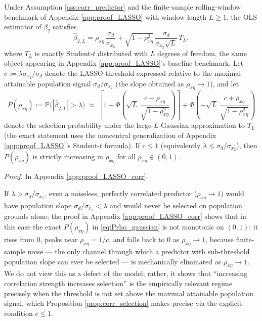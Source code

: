 \begin{proposition}\label{prop:corr_selection}
Under Assumption \ref{ass:corr_predictor} and the finite-sample rolling-window benchmark of Appendix \ref{app:proof_LASSO} with window length $L\geq 1$, the OLS estimator of $\beta_2$ satisfies
\begin{equation}\label{eq:beta2hat_L}
\hat\beta_{2,L} = \rho_{x\eta}\,\frac{\sigma_d}{\sigma_{x_2}} + \sqrt{1-\rho_{x\eta}^2}\,\frac{\sigma_d}{\sigma_{x_2}\sqrt L}\,T_L,
\end{equation}
where $T_L$ is exactly Student-$t$ distributed with $L$ degrees of freedom, the same object appearing in Appendix \ref{app:proof_LASSO}'s baseline benchmark. Let $c:=\lambda\sigma_{x_2}/\sigma_d$ denote the LASSO threshold expressed relative to the maximal attainable population signal $\sigma_d/\sigma_{x_2}$ (the slope obtained as $\rho_{x\eta}\to1$), and let
\begin{equation}\label{eq:Prho_gaussian}
P(\rho_{x\eta}) := \mathbb P\bigl(|\hat\beta_{2,L}|>\lambda\bigr) \;\approx\; \left[1-\Phi\!\left(\sqrt L\,\frac{c-\rho_{x\eta}}{\sqrt{1-\rho_{x\eta}^2}}\right)\right] + \Phi\!\left(-\sqrt L\,\frac{c+\rho_{x\eta}}{\sqrt{1-\rho_{x\eta}^2}}\right)
\end{equation}
denote the selection probability under the large-$L$ Gaussian approximation to $T_L$ (the exact statement uses the noncentral generalization of Appendix \ref{app:proof_LASSO}'s Student-$t$ formula). If $c\leq 1$ (equivalently $\lambda\leq\sigma_d/\sigma_{x_2}$), then $P(\rho_{x\eta})$ is strictly increasing in $\rho_{x\eta}$ for all $\rho_{x\eta}\in(0,1)$.
\end{proposition}
\textit{Proof.} In Appendix \ref{app:proof_LASSO_corr}.

\begin{remark}\label{rem:c_greater_1}
If $\lambda>\sigma_d/\sigma_{x_2}$, even a noiseless, perfectly correlated predictor ($\rho_{x\eta}\to1$) would have population slope $\sigma_d/\sigma_{x_2}<\lambda$ and would never be selected on population grounds alone; the proof in Appendix \ref{app:proof_LASSO_corr} shows that in this case the exact $P(\rho_{x\eta})$ in \eqref{eq:Prho_gaussian} is not monotonic on $(0,1)$: it rises from $0$, peaks near $\rho_{x\eta}=1/c$, and falls back to $0$ as $\rho_{x\eta}\to1$, because finite-sample noise — the only channel through which a predictor with sub-threshold population slope can ever be selected — is mechanically eliminated as $\rho_{x\eta}\to1$. We do not view this as a defect of the model; rather, it shows that ``increasing correlation strength increases selection'' is the empirically relevant regime precisely when the threshold is not set above the maximal attainable population signal, which Proposition \ref{prop:corr_selection} makes precise via the explicit condition $c\leq1$.
\end{remark}
